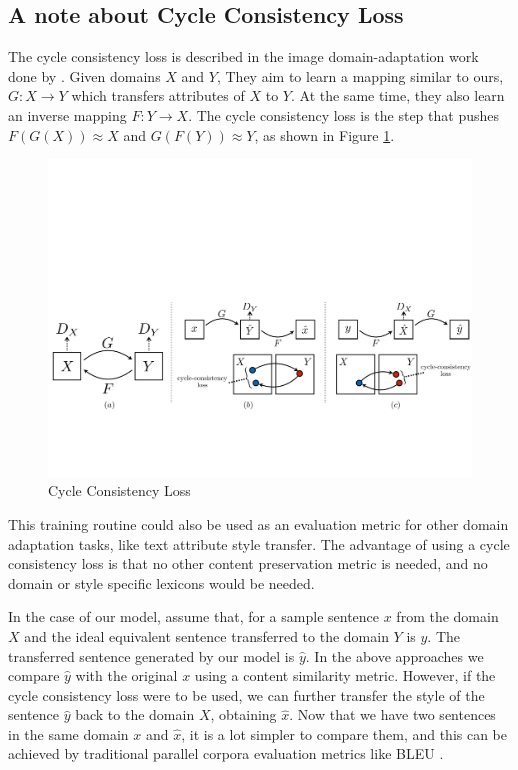 \subsection{A note about Cycle Consistency Loss}

The cycle consistency loss is described in the image domain-adaptation work done by \cite{zhu2017unpaired}. Given domains $X$ and $Y$, They aim to learn a mapping similar to ours, $G: X \rightarrow Y$ which transfers attributes of $X$ to $Y$. At the same time, they also learn an inverse mapping $F: Y \rightarrow X$. The cycle consistency loss is the step that pushes $F(G(X)) \approx X$ and $G(F(Y)) \approx Y$, as shown in Figure \ref{fig:cycle-consistency}.

\begin{figure}[ht]
	\centering
	\includegraphics[width=\textwidth]{images/cycle-consistency}
	\caption{\label{fig:cycle-consistency} Cycle Consistency Loss}
\end{figure}

This training routine could also be used as an evaluation metric for other domain adaptation tasks, like text attribute style transfer. The advantage of using a cycle consistency loss is that no other content preservation metric is needed, and no domain or style specific lexicons would be needed.

In the case of our model, assume that, for a sample sentence $x$ from the domain $X$ and the ideal equivalent sentence transferred to the domain $Y$ is $y$. The transferred sentence generated by our model is $\hat{y}$. In the above approaches we compare $\hat{y}$ with the original $x$ using a content similarity metric. However, if the cycle consistency loss were to be used, we can further transfer the style of the sentence $\hat{y}$ back to the domain $X$, obtaining $\hat{x}$. Now that we have two sentences in the same domain $x$ and $\hat{x}$, it is a lot simpler to compare them, and this can be achieved by traditional parallel corpora evaluation metrics like BLEU \citep{papineni2002bleu}.

